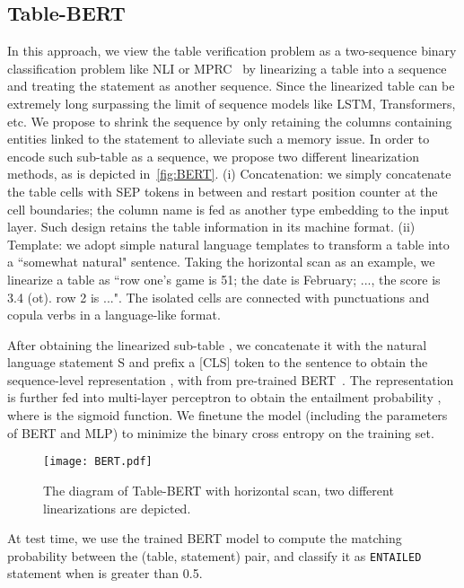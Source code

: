 \documentclass{article} \usepackage{iclr2020_conference,times}
\begin{document}
\subsection{Table-BERT}
In this approach, we view the table verification problem as a two-sequence binary classification problem like NLI or MPRC~\citep{wang2018glue} by linearizing a table  into a sequence and treating the statement as another sequence. Since the linearized table can be extremely long surpassing the limit of sequence models like LSTM, Transformers, etc. We propose to shrink the sequence by only retaining the columns containing entities linked to the statement to alleviate such a memory issue. In order to encode such sub-table as a sequence, we propose two different linearization methods, as is depicted in~\autoref{fig:BERT}. (i) Concatenation: we simply concatenate the table cells with SEP tokens in between and restart position counter at the cell boundaries; the column name is fed as another type embedding to the input layer. Such design retains the table information in its machine format. (ii) Template: we adopt simple natural language templates to transform a table into a ``somewhat natural" sentence. Taking the horizontal scan as an example, we linearize a table as ``row one's game is 51; the date is February; ..., the score is 3.4 (ot). row 2 is ...". The isolated cells are connected with punctuations and copula verbs in a language-like format. 

After obtaining the linearized sub-table , we concatenate it with the natural language statement S and prefix a [CLS] token to the sentence to obtain the sequence-level representation , with  from pre-trained BERT~\citep{devlin2018bert}. The representation is further fed into multi-layer perceptron  to obtain the entailment probability , where  is the sigmoid function. We finetune the model  (including the parameters of BERT and MLP)  to minimize the binary cross entropy  on the training set.
\begin{figure*}
    \centering
    \texttt{[image: BERT.pdf]}
    \vspace{-2ex}
    \caption{The diagram of Table-BERT with horizontal scan, two different linearizations are depicted. }
    \label{fig:BERT}
    \vspace{-2ex}
\end{figure*}
At test time, we use the trained BERT model to compute the matching probability between the (table, statement) pair, and classify it as {\tt ENTAILED} statement when  is greater than 0.5.
\end{document}
